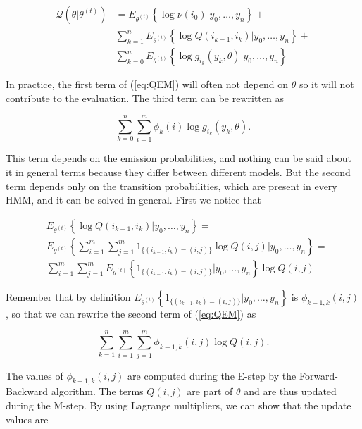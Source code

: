 \documentclass[12pt]{article}
\begin{document}
\begin{appendices}
    \begin{align}
      \mathcal{Q}(\theta|\theta^{(t)}) &=
      E_{\theta^{(t)}} \left\{ \log \nu(i_0)
      \big| y_0, \ldots, y_n \right\} + \nonumber \\
      &\sum_{k=1}^n E_{\theta^{(t)}} \left\{
        \log Q(i_{k-1}, i_k)\big| y_0,
            \ldots, y_n \right\} + \label{eq:QEM} \\
      &\sum_{k=0}^n E_{\theta^{(t)}} \left\{
        \log g_{i_k}(y_k, \theta) \big| y_0, \ldots, y_n \right\}
        \nonumber
    \end{align}

    In practice, the first term of (\ref{eq:QEM}) will often not depend
    on $\theta$ so it will not contribute to the evaluation.
    The third term can be rewritten as

    $$\sum_{k=0}^n\sum_{i=1}^m \phi_k(i) \log g_{i_k}(y_k, \theta).$$

    This term depends on the emission probabilities, and nothing
    can be said about it in general terms because they differ
    between different models. But the second term depends only on
    the transition probabilities, which are present in every HMM,
    and it can be solved in general. First we notice that

    \begin{align*}
      &E_{\theta^{(t)}} \left\{ \log Q(i_{k-1}, i_k)
      \big| y_0, \ldots, y_n \right\} = \\
      &E_{\theta^{(t)}} \left\{ \sum_{i=1}^m\sum_{j=1}^m
      1_{\{(i_{k-1}, i_k) = (i,j)\}} \log Q(i,j)
      \big| y_0, \ldots, y_n \right\} = \\
      &\sum_{i=1}^m\sum_{j=1}^m E_{\theta^{(t)}} \left\{
      1_{\{(i_{k-1}, i_k) = (i,j)\}} \big| y_0, \ldots, y_n \right\}
      \log Q(i,j)
    \end{align*}

    Remember that by definition $E_{\theta^{(t)}} \left\{
    1_{\{(i_{k-1}, i_k) = (i,j)\}} \big| y_0, \ldots, y_n \right\}$
    is $\phi_{k-1,k}(i,j)$, so that we can rewrite the second term
    of (\ref{eq:QEM}) as

    $$ \sum_{k=1}^n\sum_{i=1}^m\sum_{j=1}^m \phi_{k-1,k}(i,j)
      \log Q(i,j). $$

    The values of $\phi_{k-1,k}(i,j)$ are computed during the
    E-step by the Forward-Backward algorithm.
    The terms $Q(i,j)$ are part of $\theta$ and are thus updated
    during the M-step. By using Lagrange multipliers, we can show
    that the update values are


\end{appendices}
\end{document}
